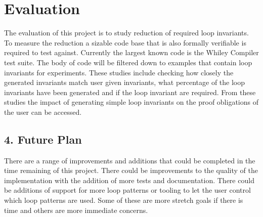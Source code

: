 \chapter{Evaluation}\label{C:eval}
%

The evaluation of this project is to study reduction of required loop
invariants.
To measure the reduction a sizable code base that is also formally verifiable
is required to test against.
Currently the largest known code is the Whiley Compiler test suite.
The body of code will be filtered down to examples that contain loop
invariants for experiments.
These studies include checking how closely the generated invariants match
user given invariants,
what percentage of the loop invariants have been generated
and if the loop invariant are required.
From these studies the impact of generating simple loop invariants on
the proof obligations of the user can be accessed.

\section*{4. Future Plan}

There are a range of improvements and additions that could be completed in
the time remaining of this project.
There could be improvements to the quality of the implementation with
the addition of more tests and documentation.
There could be additions of support for more loop patterns or tooling
to let the user control which loop patterns are used.
Some of these are more stretch goals if there is time and
others are more immediate concerns.

